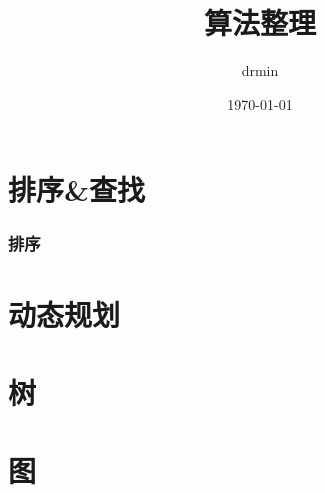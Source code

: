 \documentclass[11pt,UTF8]{article}
\author{drmin}
\title{算法整理}
\date{\today}
\begin{document}
    \maketitle
    \newpage
    \tableofcontents
    \newpage

    \part{排序\&查找}
    \section{排序}

    \part{动态规划}

    \part{树}

    \part{图}
\end{document}
